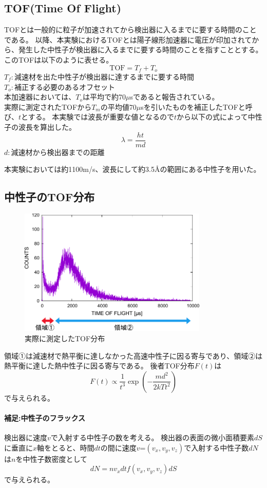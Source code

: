 \subsection{TOF(Time Of Flight)}
TOFとは一般的に粒子が加速されてから検出器に入るまでに要する時間のことである。
以降、本実験におけるTOFとは陽子線形加速器に電圧が印加されてから、発生した中性子が検出器に入るまでに要する時間のことを指すこととする。
このTOFは以下のように表せる。
\[
\mathrm{TOF}=T_f+T_o
\]
$T_f:減速材を出た中性子が検出器に達するまでに要する時間$\\
$T_o:補正する必要のあるオフセット$\\
本加速器においては、$T_o$は平均で約70$\mu$sであると報告されている。\cite{KUANS_yamashita}\\
実際に測定されたTOFから$T_m$の平均値70$\mu$sを引いたものを補正したTOFと呼び、$t$とする。
本実験では波長が重要な値となるので$t$から以下の式によって中性子の波長を算出した。
\begin{equation}
{\lambda}={\frac{ht}{md}}
\end{equation}
$d:減速材から検出器までの距離$

本実験においては約1100m/s、波長にして約3.5Åの範囲にある中性子を用いた。
\subsection{中性子のTOF分布}
\begin{figure}[H]
\centering
\includegraphics[width=9cm]{accelerator/TOF1.pdf}
\caption{実際に測定したTOF分布}
\end{figure}
領域①は減速材で熱平衡に達しなかった高速中性子に因る寄与であり、領域②は熱平衡に達した熱中性子に因る寄与である。
後者TOF分布$F(t)$は\begin{equation}F(t)\propto \frac{1}{t^{3}}\exp\left(-\frac{md^2}{2kTt^2}\right) \end{equation}で与えられる。

\paragraph{補足:中性子のフラックス} 
検出器に速度$v$で入射する中性子の数を考える。
検出器の表面の微小面積要素$dS$に垂直に$x$軸をとると、時間$dt$の間に速度{\bf $v$}=$(v_x,v_y,v_z)$で入射する中性子数$dN$は$n$を中性子数密度として
\begin{equation}
dN=nv_xdtf(v_x,v_y,v_z)dS
\end{equation}
で与えられる。

